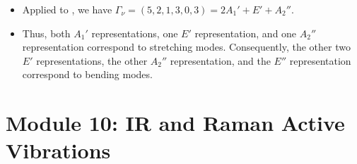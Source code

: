 \documentclass[../notes.tex]{subfiles}
\begin{document}
\begin{itemize}
    \begin{itemize}
        \item Applied to , we have $\Gamma_\nu=(5,2,1,3,0,3)=2A_1'+E'+A_2''$.
        \item Thus, both $A_1'$ representations, one $E'$ representation, and one $A_2''$ representation correspond to stretching modes. Consequently, the other two $E'$ representations, the other $A_2''$ representation, and the $E''$ representation correspond to bending modes.
    \end{itemize}
\end{itemize}



\section{Module 10: IR and Raman Active Vibrations}
\end{document}
